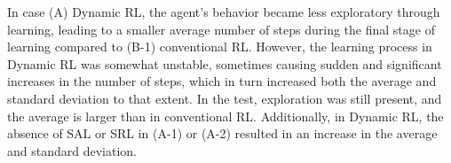 In case (A) Dynamic RL,
the agent's behavior became less exploratory through learning,
leading to a smaller average number of steps during the final stage of learning compared to (B-1) conventional RL.
However, the learning process in Dynamic RL was somewhat unstable,
sometimes causing sudden and significant increases in the number of steps,
which in turn increased both the average and standard deviation to that extent.
In the test, exploration was still present, and the average is larger than in conventional RL.
Additionally, in Dynamic RL, the absence of SAL or SRL in (A-1) or (A-2) resulted in an increase in the average and
standard deviation.

